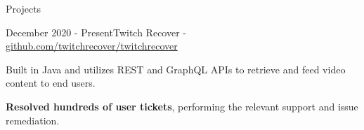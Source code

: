 \documentclass{article}
\newlength{\tabin}
\newlength{\secsep}
\newcommand{\lineunder}{\vspace*{-8pt} \\ \hspace*{-6pt} \hrulefill \\ \vspace*{-15pt}}
\newenvironment{tabbedsection}[1]{
  \begin{list}{}{
      \setlength{\itemsep}{0pt}
      \setlength{\labelsep}{0pt}
      \setlength{\labelwidth}{0pt}
      \setlength{\leftmargin}{0pt}
      \setlength{\rightmargin}{\tabin}
      \setlength{\listparindent}{0pt}
      \setlength{\parsep}{0pt}
      \setlength{\parskip}{0pt}
      \setlength{\partopsep}{0pt}
      \setlength{\topsep}{#1}
    }
  \item[]
}{\end{list}}
\newenvironment{resume_section}[1]{
  \filbreak
  \vspace{2\secsep}
  \textsc{\color{blue}\large#1}
  \lineunder
  \begin{tabbedsection}{\secsep}
}{\end{tabbedsection}}
\newenvironment{resume_subsection}[2]{
  \textbf{\color{BlueViolet}#2} \hfill {\normalsize (#1)} \hspace{-5em}
  \begin{tabbedsection}{0.5\secsep}
  \begin{subitems}
}{\end{subitems}\end{tabbedsection}}
\newenvironment{subitems}{
  \renewcommand{\labelitemi}{-}
  \begin{itemize}
      \setlength{\labelsep}{1em}
}{\end{itemize}}
\begin{document}
\begin{resume_section}{Projects}
\begin{resume_subsection}{December 2020 - Present}{Twitch Recover - \faGithub \hspace{0.01cm} \href{https://github.com/twitchrecover/twitchrecover}{github.com/twitchrecover/twitchrecover}}
        \item Built in Java and utilizes REST and GraphQL APIs to retrieve and feed video content to end users.
        \item \textbf{Resolved hundreds of user tickets}, performing the relevant support and issue remediation.
    \end{resume_subsection}
    \vspace{2\secsep}
\end{resume_section}

\vspace{2\secsep}
\end{document}
